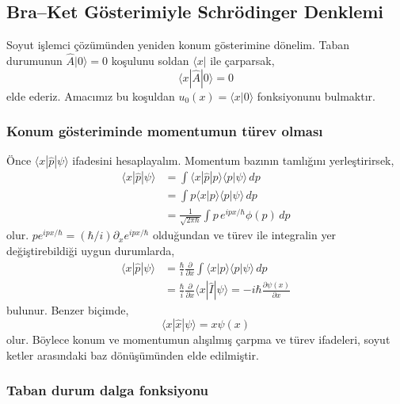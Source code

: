 \documentclass[00_kitap.tex]{subfiles}
\begin{document}
\subsection{Bra--Ket Gösterimiyle Schrödinger Denklemi}
\label{sec:06_bra_ket_sch}

Soyut işlemci çözümünden yeniden konum gösterimine dönelim.
Taban durumunun $\hat A|0\rangle=0$ koşulunu soldan
$\langle x|$ ile çarparsak,
\begin{equation}
 \langle x|\hat A|0\rangle=0
 \label{eq:06_vakum_konum}
\end{equation}
elde ederiz. Amacımız bu koşuldan $u_0(x)=\langle x|0\rangle$
fonksiyonunu bulmaktır.

\subsubsection{Konum gösteriminde momentumun türev olması}

Önce $\langle x|\hat p|\psi\rangle$ ifadesini hesaplayalım.
Momentum bazının tamlığını yerleştirirsek,
\begin{align}
 \langle x|\hat p|\psi\rangle
 &=\int\langle x|\hat p|p\rangle\langle p|\psi\rangle\,dp\\
 &=\int p\langle x|p\rangle\langle p|\psi\rangle\,dp\\
 &=\frac{1}{\sqrt{2\pi\hbar}}
      \int p\,e^{ipx/\hbar}\phi(p)\,dp
\end{align}
olur. $p e^{ipx/\hbar}=(\hbar/i)\partial_xe^{ipx/\hbar}$
olduğundan ve türev ile integralin yer değiştirebildiği uygun
durumlarda,
\begin{align}
 \langle x|\hat p|\psi\rangle
 &=\frac{\hbar}{i}\frac{\partial}{\partial x}
      \int\langle x|p\rangle\langle p|\psi\rangle\,dp\\
 &=\frac{\hbar}{i}\frac{\partial}{\partial x}
      \langle x|\hat I|\psi\rangle
 =-i\hbar\frac{\partial\psi(x)}{\partial x}
 \label{eq:06_p_turev}
\end{align}
bulunur. Benzer biçimde,
\begin{equation}
 \langle x|\hat x|\psi\rangle=x\psi(x)
\end{equation}
olur. Böylece konum ve momentumun alışılmış çarpma ve türev
ifadeleri, soyut ketler arasındaki baz dönüşümünden elde edilmiştir.

\subsubsection{Taban durum dalga fonksiyonu}
\end{document}
